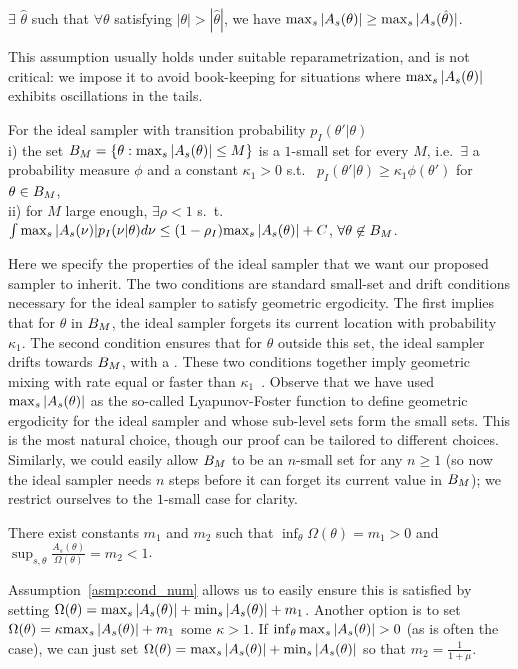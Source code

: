 \begin{assumption}
  $\exists$ $\hat{\theta}$ such that $\forall \theta$ satisfying 
  $|\theta| > |\hat{\theta}|$, we have ${\max_s |A_s(\theta)|} \ge
  {\max_s |A_s(\hat{\theta})|}$.
  \label{asmp:mono_tail}
\end{assumption}
\noindent This assumption usually holds under suitable reparametrization,
and is not critical: we impose it to avoid book-keeping for 
situations where ${\max_s |A_s(\theta)|}$ exhibits oscillations in the tails.

\begin{assumption}
For the ideal sampler with transition probability $p_I(\theta'|\theta)$ \\
i) the set $B_M=\{\theta:{\max_s |A_s(\theta)|}\le M \}$ is a $1$-small set for 
every
$M$, i.e.\ $\exists$ a probability measure $\phi$ and a constant 
$\kappa_1 > 0$ s.t.\ %
$p_I(\theta'|\theta) \geq \kappa_1 \phi(\theta')$ for $\theta \in B_M$, \\
ii) for $M$ large enough, $\exists \rho < 1$ s.\ t.\
$\int {\max_s |A_s(\nu)|} p_I(\nu|\theta) d\nu 
\leq (1-\rho_I) {\max_s |A_s(\theta)|}+C$, $\forall \theta \not\in B_M$.
  \label{asmp:ideal_geom}
\end{assumption}
\noindent Here we specify the properties of the ideal sampler that we
want our proposed sampler to inherit. The two conditions are standard 
small-set and drift conditions necessary for the ideal sampler to satisfy 
geometric ergodicity. The first implies that for $\theta$ in 
$B_M$, the ideal sampler forgets its current
location with probability $\kappa_1$. The second condition ensures that
for $\theta$ outside this set, the ideal sampler drifts towards 
$B_M$, with a . These two conditions together imply geometric
mixing with rate equal or faster than $\kappa_1$~\cite{meyn2009markov}. 
Observe that we have used ${\max_s |A_s(\theta)|}$ as the so-called Lyapunov-Foster 
function to define geometric ergodicity for the ideal sampler and whose
sub-level sets form the small sets. This is the most natural choice, 
though our proof can be tailored to different choices. Similarly, we 
could easily allow $B_M$ to be an $n$-small set for any $n\ge 1$ (so 
now the ideal sampler needs $n$ steps before it can forget its current 
value in $B_M$); we restrict ourselves to the $1$-small case for 
clarity.


\begin{assumption}
  There exist constants $m_1$ and $m_2$ such that 
  $\inf_\theta \Omega(\theta) = m_1 > 0$ and $\sup_{s,\theta}
  \frac{A_s(\theta)}{\Omega(\theta)} = m_2 < 1$. 
  \label{asmp:low_bnd}
\end{assumption}
\noindent 
Assumption~\ref{asmp:cond_num} allows us to easily ensure this is 
satisfied by setting $\Omega(\theta) = {\max_s |A_s(\theta)|} + {\min_s |A_s(\theta)|}+m_1$. 
Another option is to set $\Omega(\theta) = \kappa{\max_s |A_s(\theta)|} + m_1$ some 
$\kappa > 1$.  If $\inf_\theta {\max_s |A_s(\theta)|} > 0$ (as is often the case), 
we can just set $\Omega(\theta) = {\max_s |A_s(\theta)|} + {\min_s |A_s(\theta)|}$ so that 
$m_2 = \frac{1}{1+\mu}$. 


